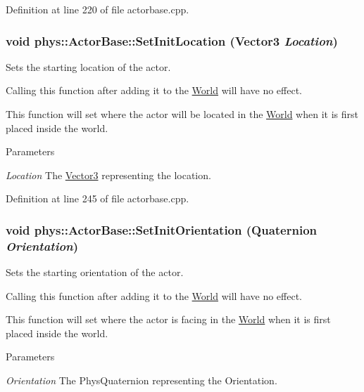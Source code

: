 Definition at line 220 of file actorbase.cpp.

\hypertarget{classphys_1_1ActorBase_a0ff0980bcf33a8205eb058b8caa1f36b}{
\subsubsection[{SetInitLocation}]{\setlength{\rightskip}{0pt plus 5cm}void phys::ActorBase::SetInitLocation ({\bf Vector3} {\em Location})}}
\label{d8/d0f/classphys_1_1ActorBase_a0ff0980bcf33a8205eb058b8caa1f36b}


Sets the starting location of the actor. 

Calling this function after adding it to the \hyperlink{classphys_1_1World}{World} will have no effect. \par
 This function will set where the actor will be located in the \hyperlink{classphys_1_1World}{World} when it is first placed inside the world. 
\begin{DoxyParams}{Parameters}
\item[{\em Location}]The \hyperlink{classphys_1_1Vector3}{Vector3} representing the location. \end{DoxyParams}


Definition at line 245 of file actorbase.cpp.

\hypertarget{classphys_1_1ActorBase_a681186465db767954ca3f9530a1d7c36}{
\subsubsection[{SetInitOrientation}]{\setlength{\rightskip}{0pt plus 5cm}void phys::ActorBase::SetInitOrientation ({\bf Quaternion} {\em Orientation})}}
\label{d8/d0f/classphys_1_1ActorBase_a681186465db767954ca3f9530a1d7c36}


Sets the starting orientation of the actor. 

Calling this function after adding it to the \hyperlink{classphys_1_1World}{World} will have no effect. \par
 This function will set where the actor is facing in the \hyperlink{classphys_1_1World}{World} when it is first placed inside the world. 
\begin{DoxyParams}{Parameters}
\item[{\em Orientation}]The PhysQuaternion representing the Orientation. \end{DoxyParams}


